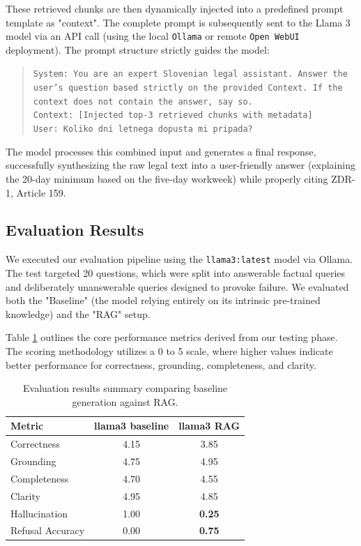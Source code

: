\documentclass[fleqn,moreauthors,10pt]{ds_report}
\begin{document}
These retrieved chunks are then dynamically injected into a predefined prompt template as "context".
The complete prompt is subsequently sent to the Llama 3 model via an API call (using the local \texttt{Ollama} or remote \texttt{Open WebUI} deployment).
The prompt structure strictly guides the model:

\begin{quote}
\texttt{System: You are an expert Slovenian legal assistant. Answer the user's question based strictly on the provided Context. If the context does not contain the answer, say so.} \\
\texttt{Context: [Injected top-3 retrieved chunks with metadata]} \\
\texttt{User: Koliko dni letnega dopusta mi pripada?}
\end{quote}

The model processes this combined input and generates a final response, successfully synthesizing the raw legal text into a user-friendly answer
(explaining the 20-day minimum based on the five-day workweek) while properly citing ZDR-1, Article 159.

\subsection*{Evaluation Results}

We executed our evaluation pipeline using the \texttt{llama3:latest} model via Ollama.
The test targeted 20 questions, which were split into answerable factual queries and deliberately unanswerable queries designed to provoke failure.
We evaluated both the "Baseline" (the model relying entirely on its intrinsic pre-trained knowledge) and the "RAG" setup.

Table \ref{tab:results} outlines the core performance metrics derived from our testing phase.
The scoring methodology utilizes a 0 to 5 scale, where higher values indicate better performance for correctness, grounding, completeness, and clarity.

\begin{table}[ht]
	\caption{Evaluation results summary comparing baseline generation against RAG.}
	\centering
	\begin{tabular}{lcc}
		\toprule
		\textbf{Metric} & \textbf{llama3 baseline} & \textbf{llama3 RAG} \\
		\midrule
		Correctness & 4.15 & 3.85 \\
		Grounding & 4.75 & 4.95 \\
		Completeness & 4.70 & 4.55 \\
		Clarity & 4.95 & 4.85 \\
		\midrule
		Hallucination & 1.00 & \textbf{0.25} \\
		Refusal Accuracy & 0.00 & \textbf{0.75} \\
		\bottomrule
	\end{tabular}
	\label{tab:results}
\end{table}
\end{document}
